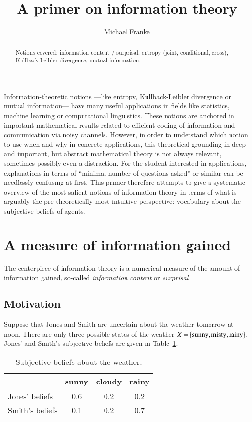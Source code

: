 \documentclass[nobib,nofonts]{tufte-handout}
\title{A primer on information theory}
\author[M.~Franke]{Michael Franke}
\date{} %
\begin{document}
\maketitle

\begin{abstract}
\noindent
Notions covered: information content / surprisal, entropy (joint, conditional, cross), Kullback-Leibler divergence, mutual information.
\end{abstract}

\noindent
Information-theoretic notions ---like entropy, Kullback-Leibler divergence or mutual information--- have many useful applications in fields like statistics, machine learning or computational linguistics.
These notions are anchored in important mathematical results related to efficient coding of information and communication via noisy channels.
However, in order to understand which notion to use when and why in concrete applications, this theoretical grounding in deep and important, but abstract mathematical theory is not always relevant, sometimes possibly even a distraction.
For the student interested in applications, explanations in terms of ``minimal number of questions asked'' or similar can be needlessly confusing at first.
This primer therefore attempts to give a systematic overview of the most salient notions of information theory in terms of what is arguably the pre-theoretically most intuitive perspective: vocabulary about the subjective beliefs of agents.

\section{A measure of information gained}

The centerpiece of information theory is a numerical measure of the amount of information gained, so-called \emph{information content} or \emph{surprisal}.

\subsection{Motivation}

Suppose that Jones and Smith are uncertain about the weather tomorrow at noon.
There are only three possible states of the weather $X = \left\{\text{sunny}, \text{misty}, \text{rainy}\right\}$.
Jones' and Smith's subjective beliefs are given in Table~\ref{tab:beliefs-weather}.

\begin{table}
  \centering
  \begin{tabular}{lccc}
    & sunny & cloudy & rainy \\ \midrule
    Jones' beliefs  & 0.6   & 0.2    & 0.2   \\
    Smith's beliefs & 0.1   & 0.2    & 0.7   \\
  \end{tabular}

  \caption{Subjective beliefs about the weather.}
  \label{tab:beliefs-weather}
\end{table}
\end{document}
